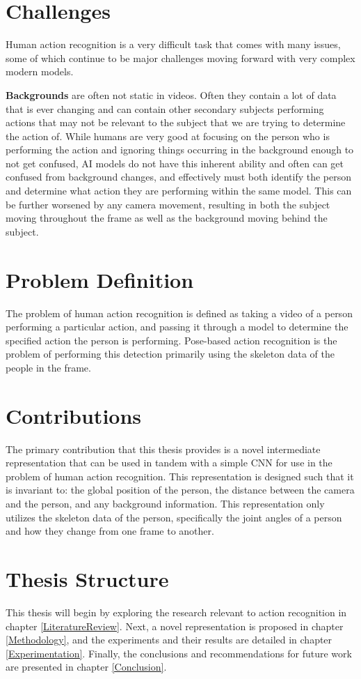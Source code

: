 \section{Challenges}
\label{sec:challenges}

Human action recognition is a very difficult task that comes with many issues, some of which continue to be major challenges moving forward with very complex modern models.

\textbf{Backgrounds} are often not static in videos. Often they contain a lot of data that is ever changing and can contain other secondary subjects performing actions that may not be relevant to the subject that we are trying to determine the action of. While humans are very good at focusing on the person who is performing the action and ignoring things occurring in the background enough to not get confused, AI models do not have this inherent ability and often can get confused from background changes, and effectively must both identify the person and determine what action they are performing within the same model. This can be further worsened by any camera movement, resulting in both the subject moving throughout the frame as well as the background moving behind the subject.

\section{Problem Definition}

The problem of human action recognition is defined as taking a video of a person performing a particular action, and passing it through a model to determine the specified action the person is performing. Pose-based action recognition is the problem of performing this detection primarily using the skeleton data of the people in the frame.

\section{Contributions}

The primary contribution that this thesis provides is a novel intermediate representation that can be used in tandem with a simple CNN for use in the problem of human action recognition. This representation is designed such that it is invariant to: the global position of the person, the distance between the camera and the person, and any background information. This representation only utilizes the skeleton data of the person, specifically the joint angles of a person and how they change from one frame to another.

\section{Thesis Structure}

This thesis will begin by exploring the research relevant to action recognition in chapter \ref{LiteratureReview}. Next, a novel representation is proposed in chapter \ref{Methodology}, and the experiments and their results are detailed in chapter \ref{Experimentation}. Finally, the conclusions and recommendations for future work are presented in chapter \ref{Conclusion}.